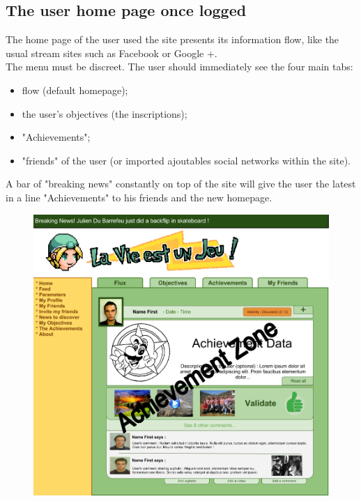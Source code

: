 \documentclass {life-en}
\begin{document}
\newpage

\subsection{The user home page once logged}

The home page of the user used the site presents its information flow, like the usual stream sites such as Facebook or Google +. \\

The menu must be discreet. The user should immediately see the four main tabs:

\begin{itemize}
  \item flow (default homepage);
  \item the user's objectives (the inscriptions);
  \item "Achievements";
  \item "friends" of the user (or imported ajoutables social networks within the site).
\end{itemize}

A bar of "breaking news" constantly on top of the site will give the user the latest in a line "Achievements" to his friends and the new homepage.

\begin{figure} [H]
  \begin{center}
    \includegraphics [width = 15cm]{img/accueil.png}
  \end{center}
\end{figure}
\end{document}
